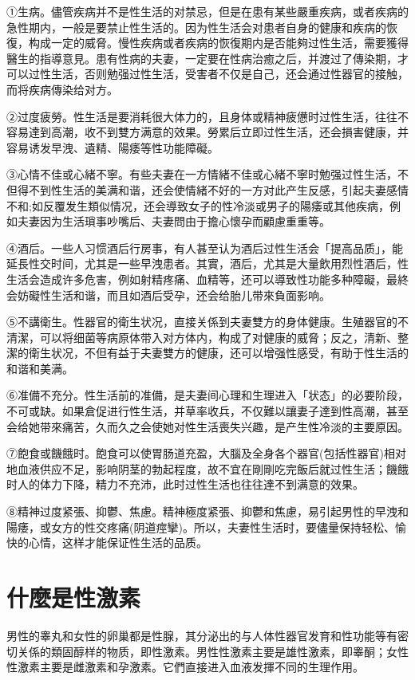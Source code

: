 \documentclass[12pt,UTF8]{ctexbook}
\begin{document}
①生病。儘管疾病并不是性生活的对禁忌，但是在患有某些嚴重疾病，或者疾病的急性期内，一般是要禁止性生活的。因为性生活会对患者自身的健康和疾病的恢復，构成一定的威脅。慢性疾病或者疾病的恢復期内是否能夠过性生活，需要獲得醫生的指導意見。患有性病的夫妻，一定要在性病治癒之后，并渡过了傳染期，才可以过性生活，否则勉强过性生活，受害者不仅是自己，还会通过性器官的接触，而将疾病傳染给对方。

②过度疲勞。性生活是要消耗很大体力的，且身体或精神疲憊时过性生活，往往不容易達到高潮，收不到雙方满意的效果。勞累后立即过性生活，还会損害健康，并容易诱发早洩、遺精、陽痿等性功能障礙。

③心情不佳或心緒不寧。有些夫妻在一方情緒不佳或心緒不寧时勉强过性生活，不但得不到性生活的美满和谐，还会使情緒不好的一方对此产生反感，引起夫妻感情不和;如反覆发生類似情况，还会導致女子的性冷淡或男子的陽痿或其他疾病，例如夫妻因为生活瑣事吵嘴后、夫妻問由于擔心懷孕而顧慮重重等。

④酒后。一些人习惯酒后行房事，有人甚至认为酒后过性生活会「提高品质」，能延長性交时间，尤其是一些早洩患者。其實，酒后，尤其是大量飲用烈性酒后，性生活会造成许多危害，例如射精疼痛、血精等，还可以導致性功能多种障礙，最終会妨礙性生活和谐，而且如酒后受孕，还会给胎儿带來負面影响。

⑤不講衛生。性器官的衛生状况，直接关係到夫妻雙方的身体健康。生殖器官的不清潔，可以将细菌等病原体带入对方体内，构成了对健康的威脅；反之，清新、整潔的衛生状况，不但有益于夫妻雙方的健康，还可以增强性感受，有助于性生活的和谐和美满。

⑥准備不充分。性生活前的准備，是夫妻间心理和生理进入「状态」的必要阶段，不可或缺。如果倉促进行性生活，并草率收兵，不仅難以讓妻子達到性高潮，甚至会给她带來痛苦，久而久之会使她对性生活喪失兴趣，是产生性冷淡的主要原因。

⑦飽食或饑餓时。飽食可以使胃肠道充盈，大腦及全身各个器官(包括性器官)相对地血液供应不足，影响阴茎的勃起程度，故不宜在剛剛吃完飯后就过性生活；饑餓时人的体力下降，精力不充沛，此时过性生活也往往達不到满意的效果。

⑧精神过度紧張、抑鬱、焦慮。精神極度紧張、抑鬱和焦慮，易引起男性的早洩和陽痿，或女方的性交疼痛(阴道痙攣)。所以，夫妻性生活时，要儘量保持轻松、愉快的心情，这样才能保证性生活的品质。

\section{什麼是性激素}

男性的睾丸和女性的卵巢都是性腺，其分泌出的与人体性器官发育和性功能等有密切关係的類固醇样的物质，即性激素。男性性激素主要是雄性激素，即睾酮；女性性激素主要是雌激素和孕激素。它們直接进入血液发揮不同的生理作用。
\end{document}
